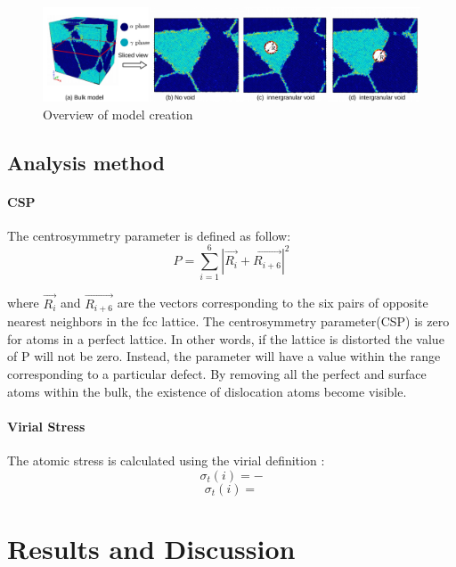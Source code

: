 \documentclass[times,12pt]{elsarticle}
\begin{document}
\begin{figure}[h]
	\centering
	\includegraphics[width=1\linewidth]{img/models}
	\caption{Overview of model creation}
	\label{fig:model-creation}
\end{figure}

\subsection{Analysis method}
\paragraph{CSP}
The centrosymmetry parameter is defined as follow:
\begin{equation} \label{eq:csp} 
	P = \displaystyle\sum_{i=1}^{6}|\vec{R_i}+\vec{R_{i+6}}|^2
\end{equation}

where $\vec{R_i}$ and $\vec{R_{i+6}}$ are the vectors corresponding to the six pairs of opposite nearest neighbors in the fcc lattice. The centrosymmetry parameter(CSP) is zero for atoms in a perfect lattice. In other words, if the lattice is distorted the value of P will not be zero. Instead, the parameter will have a value within the range corresponding to a particular defect. By removing all the perfect and surface atoms within the bulk, the existence of dislocation atoms become visible.
	
\paragraph{Virial Stress}
The atomic stress is calculated using the virial definition :
$$\sigma_t(i)=-$$
$$\sigma_t(i)= $$
   
\section{Results and Discussion}
\end{document}
